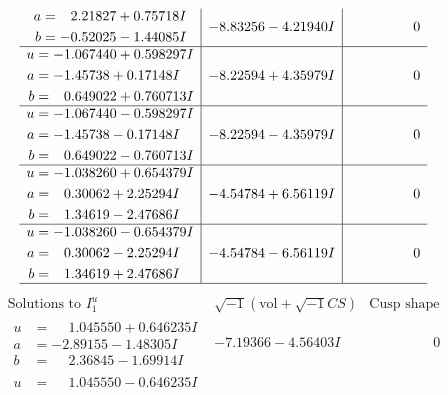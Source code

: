 \documentclass[1p]{elsarticle_modified}
\theoremstyle{definition}
\newcommand{\I}{\sqrt{-1}}
\begin{document}
$$\begin{array}{c|c|c}
\begin{aligned}
a &= \phantom{-}2.21827 + 0.75718 I \\
b &= -0.52025 - 1.44085 I\end{aligned}
 & -8.83256 - 4.21940 I & \phantom{-0.000000 } 0 \\ \hline\begin{aligned}
u &= -1.067440 + 0.598297 I \\
a &= -1.45738 + 0.17148 I \\
b &= \phantom{-}0.649022 + 0.760713 I\end{aligned}
 & -8.22594 + 4.35979 I & \phantom{-0.000000 } 0 \\ \hline\begin{aligned}
u &= -1.067440 - 0.598297 I \\
a &= -1.45738 - 0.17148 I \\
b &= \phantom{-}0.649022 - 0.760713 I\end{aligned}
 & -8.22594 - 4.35979 I & \phantom{-0.000000 } 0 \\ \hline\begin{aligned}
u &= -1.038260 + 0.654379 I \\
a &= \phantom{-}0.30062 + 2.25294 I \\
b &= \phantom{-}1.34619 - 2.47686 I\end{aligned}
 & -4.54784 + 6.56119 I & \phantom{-0.000000 } 0 \\ \hline\begin{aligned}
u &= -1.038260 - 0.654379 I \\
a &= \phantom{-}0.30062 - 2.25294 I \\
b &= \phantom{-}1.34619 + 2.47686 I\end{aligned}
 & -4.54784 - 6.56119 I & \phantom{-0.000000 } 0\\
 \hline 
 \end{array}$$\newpage$$\begin{array}{c|c|c}  
\text{Solutions to }I^u_{1}& \I (\text{vol} + \sqrt{-1}CS) & \text{Cusp shape}\\
 \hline 
\begin{aligned}
u &= \phantom{-}1.045550 + 0.646235 I \\
a &= -2.89155 - 1.48305 I \\
b &= \phantom{-}2.36845 - 1.69914 I\end{aligned}
 & -7.19366 - 4.56403 I & \phantom{-0.000000 } 0 \\ \hline\begin{aligned}
u &= \phantom{-}1.045550 - 0.646235 I \\

\end{aligned}
\end{array}$$
\end{document}
